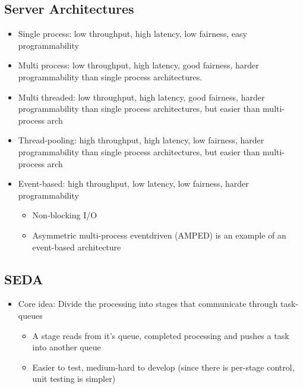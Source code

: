 \documentclass[a4paper]{article}
\begin{document}
\subsection{Server Architectures}

\begin{itemize}
\item
    Single process: low throughput, high latency, low fairness, easy
    programmability
\item
    Multi process: low throughput, high latency, good fairness, harder
    programmability than single process architectures.
\item
    Multi threaded: low throughput, high latency, good fairness, harder
    programmability than single process architectures, but easier than
    multi-process arch
\item
    Thread-pooling: high throughput, high latency, low fairness, harder
    programmability than single process architectures, but easier than
    multi-process arch
\item
    Event-based: high throughput, low latency, low fairness, harder
    programmability

    \begin{itemize}
        \item
        Non-blocking I/O
    \item
        Asymmetric multi-process eventdriven (AMPED) is an example of an
        event-based architecture
    \end{itemize}
\end{itemize}

\subsection{SEDA}

\begin{itemize}
\item
    Core idea: Divide the processing into stages that communicate through
    task-queues

    \begin{itemize}
        \item
        A stage reads from it's queue, completed processing and pushes a
        task into another queue
    \item
        Easier to test, medium-hard to develop (since there is per-stage
        control, unit testing is simpler)
    \end{itemize}
\end{itemize}
\end{document}
